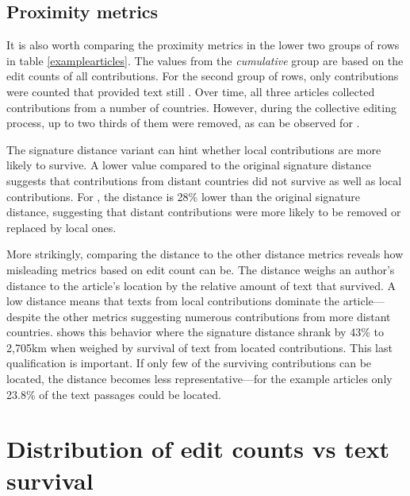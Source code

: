 \subsection{Proximity metrics}\label{sub:proximitymetrics}

It is also worth comparing the proximity metrics in the lower two groups of rows in table \ref{examplearticles}.
The values from the \emph{cumulative} group are based on the edit counts of all contributions.
For the second group of rows, only contributions were counted that provided text still .
Over time, all three articles collected contributions from a number of countries. 
However, during the collective editing process, up to two thirds of them were removed, as can be observed for  . 

The signature distance variant  can hint whether local contributions are more likely to survive.
A lower  value compared to the original signature distance suggests that contributions from distant countries did not survive as well as local contributions.
For , the  distance is 28\% lower than  the original signature distance, suggesting that distant contributions were more likely to be removed or replaced by local ones.

More strikingly, comparing the  distance to the other distance metrics reveals how misleading metrics based on edit count can be.
The  distance weighs an author's distance to the article's location by the relative amount of text that survived.
A low  distance means that texts from local contributions dominate the article---despite the other metrics suggesting numerous contributions from more distant countries.
  shows this behavior where the signature distance shrank by 43\% to 2,705km when weighed by survival of text from located contributions. 
This last qualification is important.
If only few of the surviving contributions can be located, the  distance becomes less representative---for the example articles only 23.8\% of the text passages could be located.


\section{Distribution of edit counts vs text survival}\label{sec:editcountvstextsurvival}

